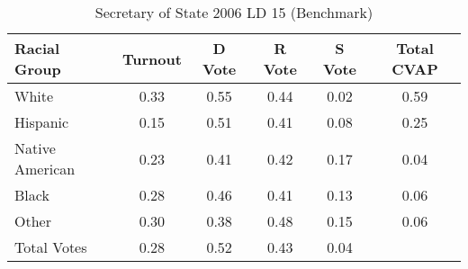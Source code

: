 \begin{table}[htb]
\begin{center}
\caption{Secretary of State 2006 LD 15 (Benchmark)}
\label{sos06_cvap_ld_15_benchmark}
\begin{tabular}{lccccc}
  \hline
Racial Group & Turnout & D Vote & R Vote & S Vote & Total CVAP \\ 
  \hline
White & 0.33 & 0.55 & 0.44 & 0.02 & 0.59 \\ 
  Hispanic & 0.15 & 0.51 & 0.41 & 0.08 & 0.25 \\ 
  Native American & 0.23 & 0.41 & 0.42 & 0.17 & 0.04 \\ 
  Black & 0.28 & 0.46 & 0.41 & 0.13 & 0.06 \\ 
  Other & 0.30 & 0.38 & 0.48 & 0.15 & 0.06 \\ 
  Total Votes & 0.28 & 0.52 & 0.43 & 0.04 &  \\ 
   \hline
\end{tabular}
\end{center}
\end{table}
